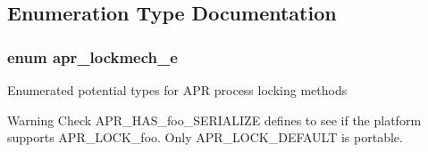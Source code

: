 \subsection{Enumeration Type Documentation}
\hypertarget{group__apr__proc__mutex_ga75dd95a48a1e855a87b509b522746ed4}{
\subsubsection[{apr\-\_\-lockmech\-\_\-e}]{\setlength{\rightskip}{0pt plus 5cm}enum {\bf apr\-\_\-lockmech\-\_\-e}}}\label{group__apr__proc__mutex_ga75dd95a48a1e855a87b509b522746ed4}
Enumerated potential types for A\-P\-R process locking methods \begin{DoxyWarning}{Warning}
Check A\-P\-R\-\_\-\-H\-A\-S\-\_\-foo\-\_\-\-S\-E\-R\-I\-A\-L\-I\-Z\-E defines to see if the platform supports A\-P\-R\-\_\-\-L\-O\-C\-K\-\_\-foo. Only A\-P\-R\-\_\-\-L\-O\-C\-K\-\_\-\-D\-E\-F\-A\-U\-L\-T is portable. 
\end{DoxyWarning}
